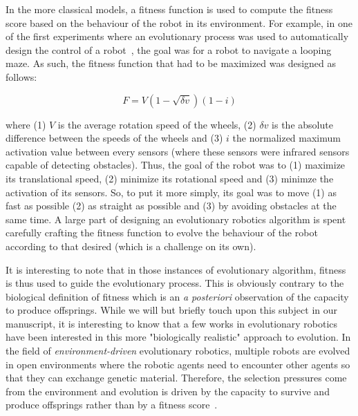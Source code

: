     In the more classical models, a fitness function is used to compute the fitness score based on the behaviour of the robot in its environment. For example, in one of the first experiments where an evolutionary process was used to automatically design the control of a robot~\parencite{Floreano1994}, the goal was for a robot to navigate a looping maze. As such, the fitness function that had to be maximized was designed as follows:

    \[
      F = V(1-\sqrt{\delta v})(1-i)
    \]

    where (1) $V$ is the average rotation speed of the wheels, (2) $\delta v$ is the absolute difference between the speeds of the wheels and (3) $i$ the normalized maximum activation value between every sensors (where these sensors were infrared sensors capable of detecting obstacles). Thus, the goal of the robot was to (1) maximize its translational speed, (2) minimize its rotational speed and (3) minimze the activation of its sensors. So, to put it more simply, its goal was to move (1) as fast as possible (2) as straight as possible and (3) by avoiding obstacles at the same time. A large part of designing an evolutionary robotics algorithm is spent carefully crafting the fitness function to evolve the behaviour of the robot according to that desired (which is a challenge on its own).

    It is interesting to note that in those instances of evolutionary algorithm, fitness is thus used to guide the evolutionary process. This is obviously contrary to the biological definition of fitness which is an \emph{a posteriori} observation of the capacity to produce offsprings. While we will but briefly touch upon this subject in our manuscript, it is interesting to know that a few works in evolutionary robotics have been interested in this more "biologically realistic" approach to evolution. In the field of \emph{environment-driven} evolutionary robotics, multiple robots are evolved in open environments where the robotic agents need to encounter other agents so that they can exchange genetic material. Therefore, the selection pressures come from the environment and evolution is driven by the capacity to survive and produce offsprings rather than by a fitness score~\parencite{Ray1991, Bianco2004, Bredeche2010}.

